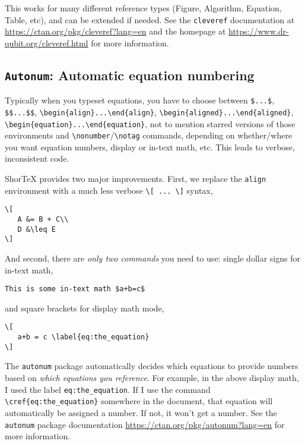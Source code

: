 \documentclass{article}
\begin{document}
This works for many different reference types (Figure, Algorithm, Equation, Table, etc),
and can be extended if needed. See the \texttt{cleveref} documentation 
at \url{https://ctan.org/pkg/cleveref?lang=en} and the homepage at \url{https://www.dr-qubit.org/cleveref.html} 
for more information.

\subsection{\texttt{Autonum}: Automatic equation numbering}

Typically when you typeset equations, you have to choose between 
\verb!$...$!, \verb!$$...$$!, 
\verb!\begin{align}...\end{align}!, 
\verb!\begin{aligned}...\end{aligned}!, 
\verb!\begin{equation}...\end{equation}!, 
not to mention starred versions of those environments 
and \verb!\nonumber!/\verb!\notag! commands, depending 
on whether/where you want equation numbers,
display or in-text math, etc. This leads to verbose, inconsistent code.

ShorTeX provides two major improvements. First, we replace 
the \verb!align! environment with a much less verbose \verb!\[ ... \]! syntax,
\begin{verbatim}
\[
   A &= B + C\\
   D &\leq E
\]
\end{verbatim}
And second, there are \textit{only two commands} you need to use:
single dollar signs for in-text math,
\begin{verbatim}
This is some in-text math $a+b=c$
\end{verbatim}
and square brackets for display math mode,
\begin{verbatim}
\[
   a+b = c \label{eq:the_equation}
\]
\end{verbatim}
The \texttt{autonum} package automatically decides which equations to provide numbers based 
on \textit{which equations you reference}. For example, in the above display math, I used
the label \verb!eq:the_equation!. If I use the command \verb!\cref{eq:the_equation}! somewhere
in the document, that equation will automatically be assigned a number. If not, it
won't get a number. See the \texttt{autonum} package 
documentation \url{https://ctan.org/pkg/autonum?lang=en} for more information.
\end{document}
